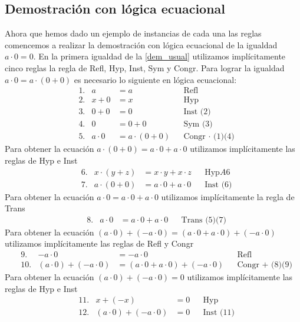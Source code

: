 \documentclass[a4paper]{article}
\begin{document}
\subsection{Demostración con lógica ecuacional}
\noindent
Ahora que hemos dado un ejemplo de instancias de cada una las reglas comencemos
a realizar la demostración con lógica ecuacional de la igualdad \(a \cdot 0 = 0\).
\newline 
En la primera igualdad de la \ref{dem_usual} utilizamos implícitamente cinco reglas
la regla de Refl, Hyp, Inst, Sym y Congr.
\newline 
Para lograr la igualdad \(a \cdot 0 = a \cdot (0 + 0)\) es necesario lo siguiente en lógica
ecuacional:
\begin{align*}
    &\text{1.} & a &= a & &\text{Refl} \\
    &\text{2.} & x + 0 &= x & &\text{Hyp} \\
    &\text{3.} & 0 + 0 &= 0 & &\text{Inst (2)} \\
    &\text{4.} & 0 &= 0 + 0 & &\text{Sym (3)} \\
    &\text{5.} & a \cdot 0 &= a \cdot (0 + 0) & &\text{Congr \(\cdot\) (1)(4)}
\end{align*}
Para obtener la ecuación \(a \cdot (0 + 0) = a \cdot 0 + a \cdot 0\) utilizamos 
implícitamente las reglas de Hyp e Inst
\begin{align*}
    &\text{6.} & x \cdot (y + z) &= x \cdot y + x \cdot z & &\text{Hyp} A6 \\
    &\text{7.} & a \cdot (0 + 0) &= a \cdot 0 + a \cdot 0 & &\text{Inst (6)}
\end{align*}
Para obtener la ecuación \(a \cdot 0 = a \cdot 0 + a \cdot 0\) utilizamos 
implícitamente la regla de Trans
\begin{align*}
    &\text{8.} & a \cdot 0 &= a \cdot 0 + a \cdot 0 & &\text{Trans (5)(7)}
\end{align*}
Para obtener la ecuación \((a \cdot 0) + (-a \cdot 0)  = (a \cdot 0 + a \cdot 0) + (-a \cdot 0)\)
utilizamos implícitamente las reglas de Refl y Congr
\begin{align*}
    &\text{9.} & -a \cdot 0 &= -a \cdot 0 & &\text{Refl} \\
    &\text{10.} & (a \cdot 0) + (-a \cdot 0) &= (a \cdot 0 + a \cdot 0) + (-a \cdot 0) & &\text{Congr + (8)(9)}
\end{align*}
Para obtener la ecuación \((a \cdot 0) + (-a \cdot 0) = 0\) utilizamos implícitamente las reglas de Hyp e Inst
\begin{align*}
    &\text{11.} & x + (-x) &= 0 & &\text{Hyp} \\
    &\text{12.} & (a \cdot 0) + (-a \cdot 0) &= 0 & &\text{Inst (11)}
\end{align*}
\end{document}
